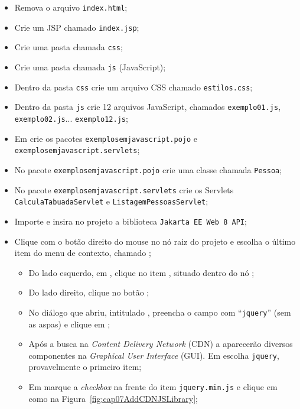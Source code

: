 \begin{itemize}
    \item Remova o arquivo \texttt{index.html};
    \item Crie um JSP chamado \texttt{index.jsp};
    \item Crie uma pasta chamada \texttt{css};
    \item Crie uma pasta chamada \texttt{js} (JavaScript);
    \item Dentro da pasta \texttt{css} crie um arquivo CSS chamado \texttt{estilos.css};
    \item Dentro da pasta \texttt{js} crie 12 arquivos JavaScript, chamados \texttt{exemplo01.js}, \texttt{exemplo02.js}... \texttt{exemplo12.js};
    \item Em  crie os pacotes \texttt{exemplosemjavascript.pojo} e\newline%
    \texttt{exemplosemjavascript.servlets};
    \item No pacote \texttt{exemplosemjavascript.pojo} crie uma classe chamada \texttt{Pessoa};
    \item No pacote \texttt{exemplosemjavascript.servlets} crie os Servlets \texttt{CalculaTabuadaServlet} e \texttt{ListagemPessoasServlet};
    \item Importe e insira no projeto a biblioteca \texttt{Jakarta EE Web 8 API};
    \item Clique com o botão direito do mouse no nó raiz do projeto e escolha o último item do menu de contexto, chamado ;
    \begin{itemize}
        \item Do lado esquerdo, em , clique no item , situado dentro do nó ;
        \item Do lado direito, clique no botão ;
        \item No diálogo que abriu, intitulado , preencha o campo  com ``\texttt{jquery}'' (sem as aspas) e clique em ;
        \item Após a busca na \textit{Content Delivery Network} (CDN) a aparecerão diversos componentes na \textit{Graphical User Interface} (GUI). Em  escolha \texttt{jquery}, provavelmente o primeiro item;
        \item Em  marque a \textit{checkbox} na frente do item \texttt{jquery.min.js} e clique em  como na Figura~\ref{fig:cap07AddCDNJSLibrary};

\end{itemize}
\end{itemize}
